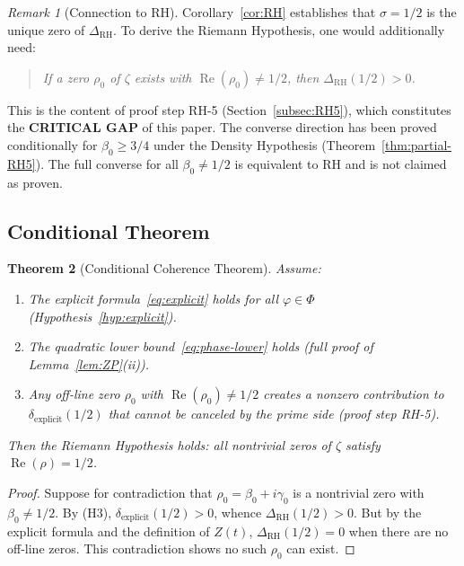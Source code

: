 \documentclass[11pt]{article}
\newtheorem{theorem}{Theorem}[section]
\theoremstyle{remark}
\newtheorem{remark}[theorem]{Remark}
\DeclareMathOperator{\Rea}{Re}
\begin{document}
\begin{remark}[Connection to RH]
\label{rem:RH-gap}
Corollary~\ref{cor:RH} establishes that $\sigma=1/2$ is the unique zero of
$\Delta_{\mathrm{RH}}$.
To derive the Riemann Hypothesis, one would additionally need:
\begin{quote}
  \emph{If a zero $\rho_0$ of $\zeta$ exists with $\Rea(\rho_0)\neq 1/2$, then
  $\Delta_{\mathrm{RH}}(1/2)>0$.}
\end{quote}
This is the content of proof step RH-5 (Section~\ref{subsec:RH5}), which constitutes
the \textbf{CRITICAL GAP} of this paper.
The converse direction has been proved conditionally for $\beta_0 \geq 3/4$
under the Density Hypothesis (Theorem~\ref{thm:partial-RH5}).
The full converse for all $\beta_0 \neq 1/2$ is equivalent to RH and
is not claimed as proven.
\end{remark}

\subsection{Conditional Theorem}

\begin{theorem}[Conditional Coherence Theorem]
\label{thm:conditional}
Assume:
\begin{enumerate}
  \item[(H1)] The explicit formula~\eqref{eq:explicit} holds for all
    $\varphi\in\Phi$ (Hypothesis~\ref{hyp:explicit}).
  \item[(H2)] The quadratic lower bound~\eqref{eq:phase-lower} holds
    (full proof of Lemma~\ref{lem:ZP}(ii)).
  \item[(H3)] Any off-line zero $\rho_0$ with $\Rea(\rho_0)\neq 1/2$ creates a
    nonzero contribution to $\delta_{\mathrm{explicit}}(1/2)$ that cannot be canceled
    by the prime side (proof step RH-5).
\end{enumerate}
Then the Riemann Hypothesis holds: all nontrivial zeros of $\zeta$ satisfy
$\Rea(\rho)=1/2$.
\end{theorem}

\begin{proof}
Suppose for contradiction that $\rho_0=\beta_0+i\gamma_0$ is a nontrivial zero with
$\beta_0\neq 1/2$.
By (H3), $\delta_{\mathrm{explicit}}(1/2)>0$, whence $\Delta_{\mathrm{RH}}(1/2)>0$.
But by the explicit formula and the definition of $Z(t)$,
$\Delta_{\mathrm{RH}}(1/2)=0$ when there are no off-line zeros.
This contradiction shows no such $\rho_0$ can exist.
\end{proof}
\end{document}
